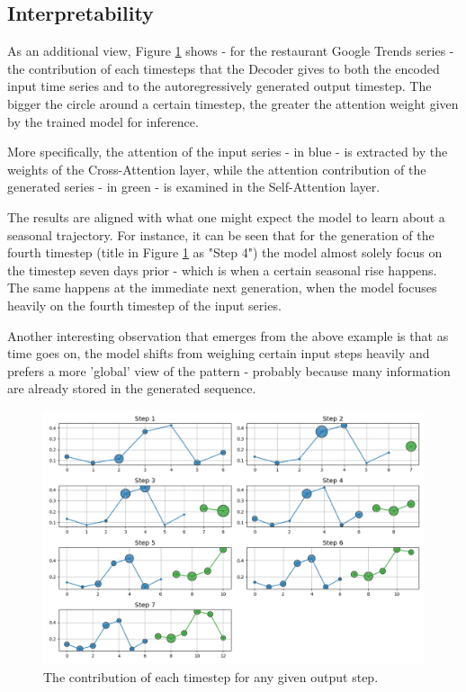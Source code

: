 \documentclass[algorithms,article,submit,pdftex,moreauthors]{Definitions/mdpi}
\begin{document}
\subsection{Interpretability}
As an additional view, Figure \ref{fig:attention} shows - for the restaurant Google Trends series - the contribution of each timesteps that the Decoder gives to both the encoded input time series and to the autoregressively generated output timestep. The bigger the circle around a certain timestep, the greater the attention weight given by the trained model for inference.

More specifically, the attention of the input series - in blue - is extracted by the weights of the Cross-Attention layer, while the attention contribution of the generated series - in green - is examined in the Self-Attention layer.

The results are aligned with what one might expect the model to learn about a seasonal trajectory. For instance, it can be seen that for the generation of the fourth timestep (title in Figure \ref{fig:attention} as "Step 4") the model almost solely focus on the timestep seven days prior - which is when a certain seasonal rise happens. The same happens at the immediate next generation, when the model focuses heavily on the fourth timestep of the input series.

Another interesting observation that emerges from the above example is that as time goes on, the model shifts from weighing certain input steps heavily and prefers a more 'global' view of the pattern - probably because many information are already stored in the generated sequence.

\begin{figure}
	\centering
	\includegraphics[width=1.0\linewidth]{attention.png}
	\caption{The contribution of each timestep for any given output step.}
	\label{fig:attention}
\end{figure}
\end{document}

